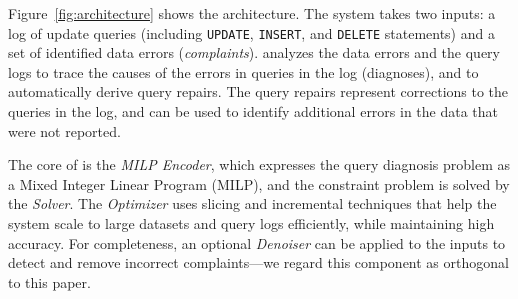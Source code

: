 Figure~\ref{fig:architecture} shows the \sys architecture. The system takes
two inputs: a log of update queries (including \texttt{UPDATE}, \texttt{INSERT}, and \texttt{DELETE}
statements) and a set of identified data errors (\emph{complaints}). \sys
analyzes the data errors and the query logs to trace the causes of the errors
in queries in the log (diagnoses), and to automatically derive query repairs.
The query repairs represent corrections to the queries in the log, and can be
used to identify additional errors in the data that were not reported.
 
The core of \sys is the \emph{MILP Encoder}, which expresses the query diagnosis
problem as a Mixed Integer Linear Program (MILP), and the constraint problem is solved by the \emph{Solver}. 
The \emph{Optimizer} uses slicing and incremental techniques that
help the system scale to large datasets and query logs efficiently, while maintaining high accuracy. 
For completeness, an optional \emph{Denoiser} can be applied to the inputs to detect and remove incorrect complaints---we regard this component as orthogonal to this paper.




